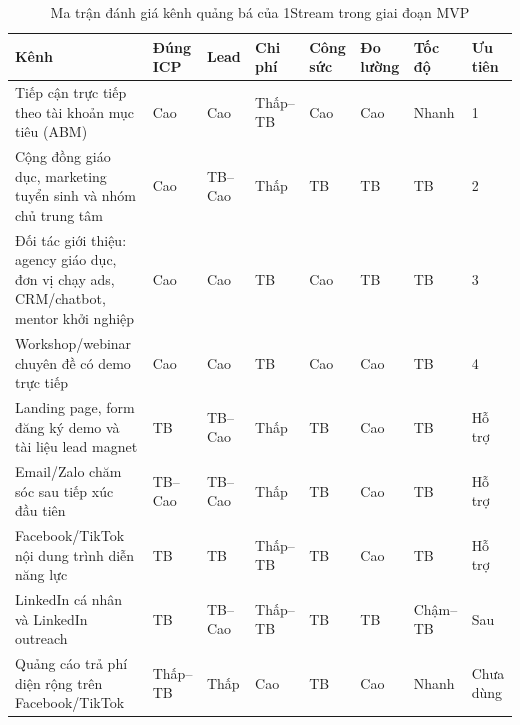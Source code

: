\begin{table}[H]
    \centering
    \footnotesize
    \setlength{\tabcolsep}{2pt}
    \renewcommand{\arraystretch}{1.22}
    \caption{Ma trận đánh giá kênh quảng bá của 1Stream trong giai đoạn MVP}
    \label{tab:channel-evaluation-1stream}
    \begin{tabularx}{\linewidth}{@{}L{3.0cm}L{1.45cm}L{1.35cm}L{1.35cm}L{1.45cm}L{1.45cm}L{1.35cm}L{1.35cm}@{}}
        \toprule
        \textbf{Kênh} &
        \textbf{Đúng ICP} &
        \textbf{Lead} &
        \textbf{Chi phí} &
        \textbf{Công sức} &
        \textbf{Đo lường} &
        \textbf{Tốc độ} &
        \textbf{Ưu tiên} \\ \midrule

        Tiếp cận trực tiếp theo tài khoản mục tiêu (ABM) &
        Cao &
        Cao &
        Thấp--TB &
        Cao &
        Cao &
        Nhanh &
        1 \\ 

        Cộng đồng giáo dục, marketing tuyển sinh và nhóm chủ trung tâm &
        Cao &
        TB--Cao &
        Thấp &
        TB &
        TB &
        TB &
        2 \\

        Đối tác giới thiệu: agency giáo dục, đơn vị chạy ads, CRM/chatbot,
        mentor khởi nghiệp &
        Cao &
        Cao &
        TB &
        Cao &
        TB &
        TB &
        3 \\

        Workshop/webinar chuyên đề có demo trực tiếp &
        Cao &
        Cao &
        TB &
        Cao &
        Cao &
        TB &
        4 \\

        Landing page, form đăng ký demo và tài liệu lead magnet &
        TB &
        TB--Cao &
        Thấp &
        TB &
        Cao &
        TB &
        Hỗ trợ \\

        Email/Zalo chăm sóc sau tiếp xúc đầu tiên &
        TB--Cao &
        TB--Cao &
        Thấp &
        TB &
        Cao &
        TB &
        Hỗ trợ \\

        Facebook/TikTok nội dung trình diễn năng lực &
        TB &
        TB &
        Thấp--TB &
        TB &
        Cao &
        TB &
        Hỗ trợ \\

        LinkedIn cá nhân và LinkedIn outreach &
        TB &
        TB--Cao &
        Thấp--TB &
        TB &
        TB &
        Chậm--TB &
        Sau \\

        Quảng cáo trả phí diện rộng trên Facebook/TikTok &
        Thấp--TB &
        Thấp &
        Cao &
        TB &
        Cao &
        Nhanh &
        Chưa dùng \\ \bottomrule
    \end{tabularx}
\end{table}

